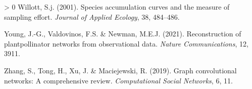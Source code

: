 \documentclass[11pt]{article}
\newlength{\cslhangindent}
\newenvironment{CSLReferences}[3] %
 {%
  \setlength{\parindent}{0pt}
  \ifodd #1 \everypar{\setlength{\hangindent}{\cslhangindent}}\ignorespaces\fi
  \ifnum #2 > 0
  \setlength{\parskip}{#2\baselineskip}
  \fi
 }%
 {}
\begin{document}
\begin{CSLReferences}{1}{0}
\leavevmode\hypertarget{ref-Willott2001SpeAcc}{}%
Willott, S.j. (2001). Species accumulation curves and the measure of
sampling effort. \emph{Journal of Applied Ecology}, 38, 484--486.

\leavevmode\hypertarget{ref-Young2021RecPla}{}%
Young, J.-G., Valdovinos, F.S. \& Newman, M.E.J. (2021). Reconstruction
of plantpollinator networks from observational data. \emph{Nature
Communications}, 12, 3911.

\leavevmode\hypertarget{ref-Zhang2019GraCon}{}%
Zhang, S., Tong, H., Xu, J. \& Maciejewski, R. (2019). Graph
convolutional networks: A comprehensive review. \emph{Computational
Social Networks}, 6, 11.

\end{CSLReferences}
\end{document}
